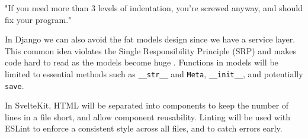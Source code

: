 \begin{displayquote}
"If you need more than 3 levels of indentation, you're screwed anyway, and should fix your program."
\end{displayquote}

\vspace{1em}
In Django we can also avoid the fat models design since we have a service layer. This common idea violates the Single Responsibility Principle (SRP) and makes code hard to read as the models become huge \parencite{martin_agile_2003}. Functions in models will be limited to essential methods such as \texttt{\_\_str\_\_} and \texttt{Meta}, \texttt{\_\_init\_\_}, and potentially \texttt{save}. 

In SvelteKit, HTML will be separated into components to keep the number of lines in a file short, and allow component reusability. Linting will be used with ESLint to enforce a consistent style across all files, and to catch errors early.